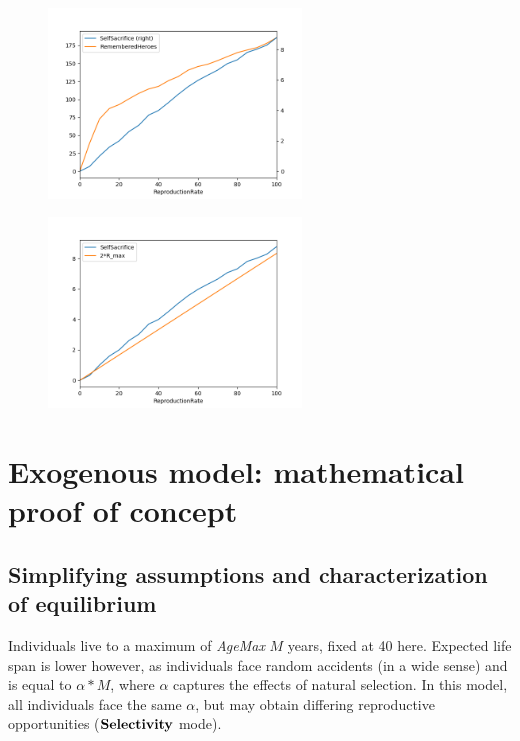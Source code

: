 \documentclass[a4paper,12pt]{report}
\begin{document}

\begin{figure}[h]
    \centering
    \includegraphics[width=0.6\textwidth]{Repro}
    \caption{}
    \label{fig:r}
    \end{figure}



    \begin{figure}[h]
        \centering
        \includegraphics[width=0.6\textwidth]{Repro_magie}
        \caption{}
        \label{fig:r_magie}
        \end{figure}
    
    


\section{Exogenous model: mathematical proof of concept}
\label{sec_exo_math}



\subsection{Simplifying assumptions and characterization of equilibrium}
\label{ss:exm_eq}
Individuals live to a maximum of \emph{AgeMax} $M$ years, fixed at 40 here. 
 Expected life span is lower however, as individuals face random accidents
 (in a wide sense) and is equal to $\alpha*M$, where $\alpha$ captures
 the effects of natural selection. In this model, all individuals face the same $\alpha$, but
 may obtain differing reproductive opportunities ($\bf{Selectivity}$ mode).
\end{document}
